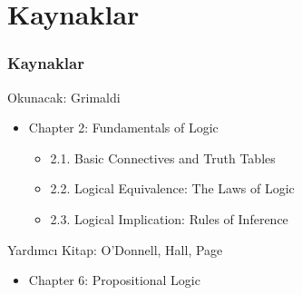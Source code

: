 \documentclass[dvipsnames]{beamer}
\theoremstyle{definition}
\theoremstyle{example}
\theoremstyle{plain}
\begin{document}
\section*{Kaynaklar}

\begin{frame}
  \frametitle{Kaynaklar}

  \begin{block}{Okunacak: Grimaldi}
    \begin{itemize}
      \item Chapter 2: Fundamentals of Logic
      \begin{itemize}
        \item 2.1. \alert{Basic Connectives and Truth Tables}
        \item 2.2. \alert{Logical Equivalence: The Laws of Logic}\\
        \item 2.3. \alert{Logical Implication: Rules of Inference}
      \end{itemize}
    \end{itemize}
  \end{block}

  \begin{block}{Yardımcı Kitap: O'Donnell, Hall, Page}
    \begin{itemize}
      \item Chapter 6: Propositional Logic
    \end{itemize}
  \end{block}
\end{frame}
\end{document}

